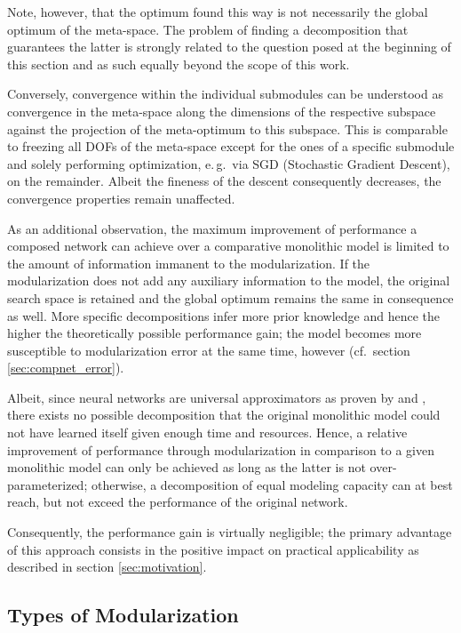Note, however, that the optimum found this way is not necessarily the global optimum of the meta-space. The problem of finding a decomposition that guarantees the latter is strongly related to the question posed at the beginning of this section and as such equally beyond the scope of this work.

Conversely, convergence within the individual submodules can be understood as convergence in the meta-space along the dimensions of the respective subspace against the projection of the meta-optimum to this subspace. This is comparable to freezing all DOFs of the meta-space except for the ones of a specific submodule and solely performing optimization, e.\,g.\ via SGD (Stochastic Gradient Descent), on the remainder. Albeit the fineness of the descent consequently decreases, the convergence properties remain unaffected.

As an additional observation, the maximum improvement of performance a composed network can achieve over a comparative monolithic model is limited to the amount of information immanent to the modularization. If the modularization does not add any auxiliary information to the model, the original search space is retained and the global optimum remains the same in consequence as well. More specific decompositions infer more prior knowledge and hence the higher the theoretically possible performance gain; the model becomes more susceptible to modularization error at the same time, however (cf.\ section \ref{sec:compnet_error}).

Albeit, since neural networks are universal approximators as proven by \cite{Kolmogorov1957-ok} and \cite{Hornik1989-nf}, there exists no possible decomposition that the original monolithic model could not have learned itself given enough time and resources. Hence, a relative improvement of performance through modularization in comparison to a given monolithic model can only be achieved as long as the latter is not over-parameterized; otherwise, a decomposition of equal modeling capacity can at best reach, but not exceed the performance of the original network.

Consequently, the performance gain is virtually negligible; the primary advantage of this approach consists in the positive impact on practical applicability as described in section \ref{sec:motivation}.

\subsection{Types of Modularization%
            \label{sec:compnet_modularization_types}}


